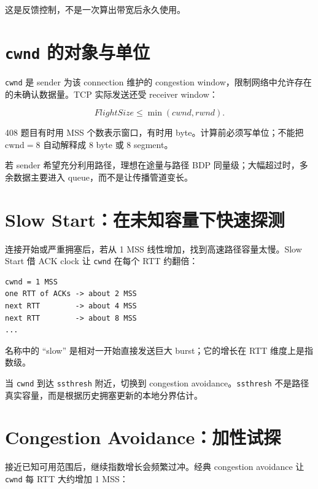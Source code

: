 \documentclass[UTF8,fontset=none,11pt,a4paper]{ctexart}
\providecommand{\passthrough}[1]{#1}
\begin{document}
这是反馈控制，不是一次算出带宽后永久使用。

\section{\texorpdfstring{\texttt{cwnd}
的对象与单位}{cwnd 的对象与单位}}\label{3-cwnd-ux7684ux5bf9ux8c61ux4e0eux5355ux4f4d}

\passthrough{\lstinline!cwnd!} 是 sender 为该 connection 维护的
congestion window，限制网络中允许存在的未确认数据量。TCP 实际发送还受
receiver window：

\[
FlightSize\le \min(cwnd,rwnd).
\]

408 题目有时用 MSS 个数表示窗口，有时用 byte。计算前必须写单位；不能把
\(\text{cwnd} = 8\) 自动解释成 8 byte 或 8 segment。

若 sender 希望充分利用路径，理想在途量与路径 BDP
同量级；大幅超过时，多余数据主要进入 queue，而不是让传播管道变长。

\section{Slow
Start：在未知容量下快速探测}\label{4-slow-startux5728ux672aux77e5ux5bb9ux91cfux4e0bux5febux901fux63a2ux6d4b}

连接开始或严重拥塞后，若从 1 MSS 线性增加，找到高速路径容量太慢。Slow
Start 借 ACK clock 让 \passthrough{\lstinline!cwnd!} 在每个 RTT 约翻倍：

\begin{lstlisting}
cwnd = 1 MSS
one RTT of ACKs -> about 2 MSS
next RTT        -> about 4 MSS
next RTT        -> about 8 MSS
...
\end{lstlisting}

名称中的 ``slow'' 是相对一开始直接发送巨大 burst；它的增长在 RTT
维度上是指数级。

当 \passthrough{\lstinline!cwnd!} 到达
\passthrough{\lstinline!ssthresh!} 附近，切换到 congestion
avoidance。\passthrough{\lstinline!ssthresh!}
不是路径真实容量，而是根据历史拥塞更新的本地分界估计。

\section{Congestion
Avoidance：加性试探}\label{5-congestion-avoidanceux52a0ux6027ux8bd5ux63a2}

接近已知可用范围后，继续指数增长会频繁过冲。经典 congestion avoidance 让
\passthrough{\lstinline!cwnd!} 每 RTT 大约增加 1 MSS：
\end{document}
